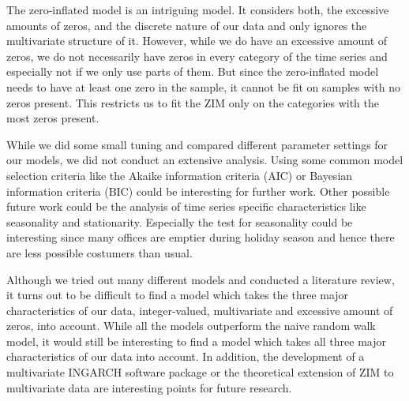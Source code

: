 The zero-inflated model is an intriguing model. It considers both, the excessive amounts of zeros, and the discrete nature of our data and only ignores the multivariate structure of it. However, while we do have an excessive amount of zeros, we do not necessarily have zeros in every category of the time series and especially not if we only use parts of them. But since the zero-inflated model needs to have at least one zero in the sample, it cannot be fit on samples with no zeros present. This restricts us to fit the ZIM only on the categories with the most zeros present. 

While we did some small tuning and compared different parameter settings for our models, we did not conduct an extensive analysis. Using some common model selection criteria like the Akaike information criteria (AIC) or Bayesian information criteria (BIC) could be interesting for further work. Other possible future work could be the analysis of time series specific characteristics like seasonality and stationarity. Especially the test for seasonality could be interesting since many offices are emptier during holiday season and hence there are less possible costumers than usual. 

Although we tried out many different models and conducted a literature review, it turns out to be difficult to find a model which takes the three major characteristics of our data, integer-valued, multivariate and excessive amount of zeros, into account. While all the models outperform the naive random walk model, it would still be interesting to find a model which takes all three major characteristics of our data into account. In addition, the development of a multivariate INGARCH software package or the theoretical extension of ZIM to multivariate data are interesting points for future research. 